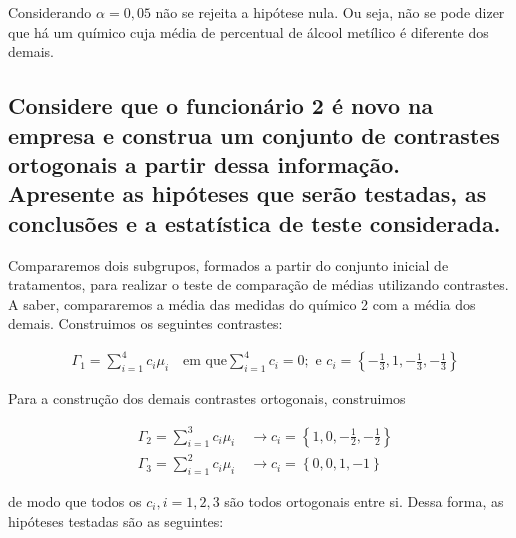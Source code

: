 \documentclass[
]{article}
\begin{document}
Considerando \(\alpha = 0,05\) não se rejeita a hipótese nula. Ou seja,
não se pode dizer que há um químico cuja média de percentual de álcool
metílico é diferente dos demais.

\hypertarget{considere-que-o-funcionuxe1rio-2-uxe9-novo-na-empresa-e-construa-um-conjunto-de-contrastes-ortogonais-a-partir-dessa-informauxe7uxe3o.-apresente-as-hipuxf3teses-que-seruxe3o-testadas-as-conclusuxf5es-e-a-estatuxedstica-de-teste-considerada.}{%
\subsection{Considere que o funcionário 2 é novo na empresa e construa
um conjunto de contrastes ortogonais a partir dessa informação.
Apresente as hipóteses que serão testadas, as conclusões e a estatística
de teste
considerada.}\label{considere-que-o-funcionuxe1rio-2-uxe9-novo-na-empresa-e-construa-um-conjunto-de-contrastes-ortogonais-a-partir-dessa-informauxe7uxe3o.-apresente-as-hipuxf3teses-que-seruxe3o-testadas-as-conclusuxf5es-e-a-estatuxedstica-de-teste-considerada.}}

Compararemos dois subgrupos, formados a partir do conjunto inicial de
tratamentos, para realizar o teste de comparação de médias utilizando
contrastes. A saber, compararemos a média das medidas do químico 2 com a
média dos demais. Construimos os seguintes contrastes:

\begin{align*}
  &\Gamma_1 = \sum\limits_{i = 1}^{4} c_i \mu_i \quad \text{em que} \sum\limits_{i = 1}^{4} c_i = 0; \text{ e } c_i = \left\{-\frac{1}{3}, 1, -\frac{1}{3}, -\frac{1}{3}\right\}
\end{align*}

Para a construção dos demais contrastes ortogonais, construimos

\begin{align*}
  &\Gamma_2 = \sum\limits_{i = 1}^{3} c_i \mu_i \quad \longrightarrow
  c_i = \left\{1, 0, -\frac{1}{2}, -\frac{1}{2}\right\} \\
  &\Gamma_3 = \sum\limits_{i = 1}^{2} c_i \mu_i \quad \longrightarrow
  c_i = \left\{0, 0, 1, -1\right\}
\end{align*}

de modo que todos os \(c_i, i = 1, 2, 3\) são todos ortogonais entre si.
Dessa forma, as hipóteses testadas são as seguintes:
\end{document}
